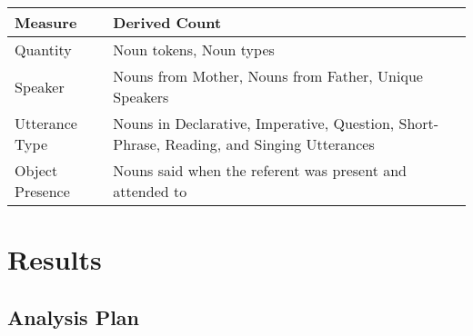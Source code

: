 \documentclass[floatsintext,man]{apa6}
\theoremstyle{definition}
\theoremstyle{definition}
\theoremstyle{definition}
\theoremstyle{remark}
\begin{document}
\begin{longtable}[]{@{}ll@{}}
\toprule
\begin{minipage}[b]{0.15\columnwidth}\raggedright\strut
Measure\strut
\end{minipage} & \begin{minipage}[b]{0.79\columnwidth}\raggedright\strut
Derived Count\strut
\end{minipage}\tabularnewline
\midrule
\endhead
\begin{minipage}[t]{0.15\columnwidth}\raggedright\strut
Quantity\strut
\end{minipage} & \begin{minipage}[t]{0.79\columnwidth}\raggedright\strut
Noun tokens, Noun types\strut
\end{minipage}\tabularnewline
\begin{minipage}[t]{0.15\columnwidth}\raggedright\strut
Speaker\strut
\end{minipage} & \begin{minipage}[t]{0.79\columnwidth}\raggedright\strut
Nouns from Mother, Nouns from Father, Unique Speakers\strut
\end{minipage}\tabularnewline
\begin{minipage}[t]{0.15\columnwidth}\raggedright\strut
Utterance Type\strut
\end{minipage} & \begin{minipage}[t]{0.79\columnwidth}\raggedright\strut
Nouns in Declarative, Imperative, Question, Short-Phrase, Reading, and
Singing Utterances\strut
\end{minipage}\tabularnewline
\begin{minipage}[t]{0.15\columnwidth}\raggedright\strut
Object Presence\strut
\end{minipage} & \begin{minipage}[t]{0.79\columnwidth}\raggedright\strut
Nouns said when the referent was present and attended to\strut
\end{minipage}\tabularnewline
\bottomrule
\end{longtable}

\section{Results}\label{results}

\subsection{Analysis Plan}\label{analysis-plan}
\end{document}
